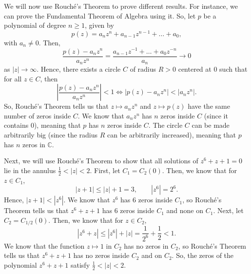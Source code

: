 \documentclass[a4paper, openany]{memoir}
\theoremstyle{definition}
\theoremstyle{plain}
\begin{document}
    We will now use Rouché's Theorem to prove different results. For instance, we can prove the Fundamental Theorem of Algebra using it. So, let $p$ be a polynomial of degree $n \geq 1$, given by
    \[p(z) = a_n z^n + a_{n-1} z^{n-1} + \dots + a_0,\]
    with $a_n \neq 0$. Then,
    \[\frac{p(z) - a_n z^n}{a_n z^n} = \frac{a_{n-1} z^{-1} + \dots + a_0 z^{-n}}{a_n} \to 0\]
    as $|z| \to \infty$. Hence, there exists a circle $C$ of radius $R > 0$ centered at $0$ such that for all $z \in C$, then 
    \[\left|\frac{p(z) - a_n z^n}{a_n z^n}\right| < 1 \iff |p(z) - a_n z^n| < |a_n z^n|.\]
    So, Rouché's Theorem tells us that $z \mapsto a_n z^n$ and $z \mapsto p(z)$ have the same number of zeros inside $C$. We know that $a_n z^n$ has $n$ zeros inside $C$ (since it contains 0), meaning that $p$ has $n$ zeros inside $C$. The circle $C$ can be made arbitrarily big (since the radius $R$ can be arbitrarily increased), meaning that $p$ has $n$ zeros in $\mathbb{C}$.

    Next, we will use Rouché's Theorem to show that all solutions of $z^6 + z + 1 = 0$ lie in the annulus $\frac{1}{2} < |z| < 2$. First, let $C_1 = C_2(0)$. Then, we know that for $z \in C_1$,
    \[|z + 1| \leq |z| + 1 = 3, \qquad |z^6| = 2^6.\]
    Hence, $|z + 1| < |z^6|$. We know that $z^6$ has 6 zeros inside $C_1$, so Rouché's Theorem tells us that $z^6 + z + 1$ has 6 zeros inside $C_1$ and none on $C_1$. Next, let $C_2 = C_{1/2}(0)$. Then, we know that for $z \in C_2$,
    \[|z^6 + z| \leq |z^6| + |z| = \frac{1}{2^6} + \frac{1}{2} < 1.\]
    We know that the function $z \mapsto 1$ in $C_2$ has no zeros in $C_2$, so Rouché's Theorem tells us that $z^6 + z + 1$ has no zeros inside $C_2$ and on $C_2$. So, the zeros of the polynomial $z^6 + z + 1$ satisfy $\frac{1}{2} < |z| < 2$.
\end{document}
